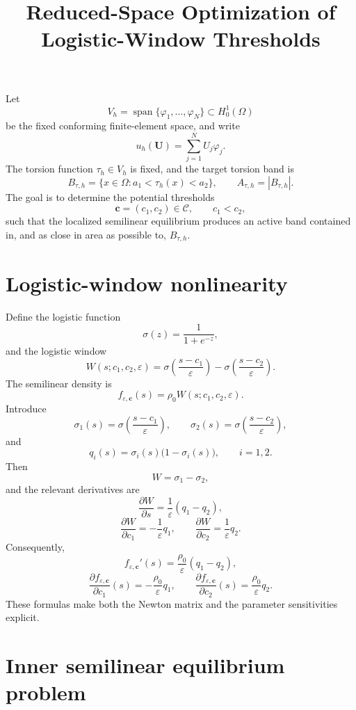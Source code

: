 \documentclass[11pt]{article}
\title{Reduced-Space Optimization of Logistic-Window Thresholds}
\author{}
\date{}
\newcommand{\cC}{\mathcal{C}}
\newcommand{\bU}{\mathbf{U}}
\newcommand{\bc}{\mathbf{c}}
\begin{document}
\maketitle

Let
\[
V_h=\operatorname{span}\{\varphi_1,\ldots,\varphi_N\}
\subset H_0^1(\Omega)
\]
be the fixed conforming finite-element space, and write
\[
u_h(\bU)=\sum_{j=1}^N U_j\varphi_j.
\]
The torsion function $\tau_h\in V_h$ is fixed, and the target torsion band is
\[
B_{\tau,h}
=
\{x\in\Omega:a_1<\tau_h(x)<a_2\},
\qquad
A_{\tau,h}=|B_{\tau,h}|.
\]
The goal is to determine the potential thresholds
\[
\bc=(c_1,c_2)\in\cC,
\qquad c_1<c_2,
\]
such that the localized semilinear equilibrium produces an active band contained in, and as close in area as possible to, $B_{\tau,h}$.

\section{Logistic-window nonlinearity}

Define the logistic function
\[
\sigma(z)=\frac{1}{1+e^{-z}},
\]
and the logistic window
\[
W(s;c_1,c_2,\varepsilon)
=
\sigma\left(\frac{s-c_1}{\varepsilon}\right)
-
\sigma\left(\frac{s-c_2}{\varepsilon}\right).
\]
The semilinear density is
\[
f_{\varepsilon,\bc}(s)
=
\rho_0 W(s;c_1,c_2,\varepsilon).
\]
Introduce
\[
\sigma_1(s)
=
\sigma\left(\frac{s-c_1}{\varepsilon}\right),
\qquad
\sigma_2(s)
=
\sigma\left(\frac{s-c_2}{\varepsilon}\right),
\]
and
\[
q_i(s)=\sigma_i(s)\bigl(1-\sigma_i(s)\bigr),
\qquad i=1,2.
\]
Then
\[
W=\sigma_1-\sigma_2,
\]
and the relevant derivatives are
\[
\frac{\partial W}{\partial s}
=
\frac{1}{\varepsilon}(q_1-q_2),
\]
\[
\frac{\partial W}{\partial c_1}
=
-\frac{1}{\varepsilon}q_1,
\qquad
\frac{\partial W}{\partial c_2}
=
\frac{1}{\varepsilon}q_2.
\]
Consequently,
\[
f_{\varepsilon,\bc}'(s)
=
\frac{\rho_0}{\varepsilon}(q_1-q_2),
\]
\[
\frac{\partial f_{\varepsilon,\bc}}{\partial c_1}(s)
=
-\frac{\rho_0}{\varepsilon}q_1,
\qquad
\frac{\partial f_{\varepsilon,\bc}}{\partial c_2}(s)
=
\frac{\rho_0}{\varepsilon}q_2.
\]
These formulas make both the Newton matrix and the parameter sensitivities explicit.

\section{Inner semilinear equilibrium problem}
\end{document}
